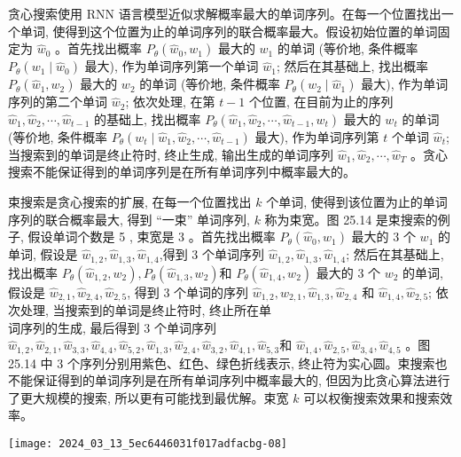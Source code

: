 \documentclass[10pt]{article}
\begin{document}
贪心搜索使用 RNN 语言模型近似求解概率最大的单词序列。在每一个位置找出一个单词, 使得到这个位置为止的单词序列的联合概率最大。假设初始位置的单词固定为 $\hat{w}_{0}$ 。首先找出概率 $P_{\theta}\left(\hat{w}_{0}, w_{1}\right)$ 最大的 $w_{1}$ 的单词 (等价地, 条件概率 $P_{\theta}\left(w_{1} \mid \hat{w}_{0}\right)$ 最大), 作为单词序列第一个单词 $\hat{w}_{1}$; 然后在其基础上, 找出概率 $P_{\theta}\left(\hat{w}_{1}, w_{2}\right)$ 最大的 $w_{2}$ 的单词 (等价地, 条件概率 $P_{\theta}\left(w_{2} \mid \hat{w}_{1}\right)$ 最大), 作为单词序列的第二个单词 $\hat{w}_{2}$; 依次处理, 在第 $t-1$ 个位置, 在目前为止的序列 $\hat{w}_{1}, \hat{w}_{2}, \cdots, \hat{w}_{t-1}$ 的基础上, 找出概率 $P_{\theta}\left(\hat{w}_{1}, \hat{w}_{2}, \cdots, \hat{w}_{t-1}, w_{t}\right)$ 最大的 $w_{t}$ 的单词 (等价地, 条件概率 $P_{\theta}\left(w_{t} \mid \hat{w}_{1}, \hat{w}_{2}, \cdots, \hat{w}_{t-1}\right)$ 最大), 作为单词序列第 $t$ 个单词 $\hat{w}_{t}$; 当搜索到的单词是终止符时, 终止生成, 输出生成的单词序列 $\hat{w}_{1}, \hat{w}_{2}, \cdots, \hat{w}_{T}$ 。贪心搜索不能保证得到的单词序列是在所有单词序列中概率最大的。

束搜索是贪心搜索的扩展, 在每一个位置找出 $k$ 个单词, 使得到该位置为止的单词序列的联合概率最大, 得到 “一束” 单词序列, $k$ 称为束宽。图 25.14 是束搜索的例子, 假设单词个数是 5 , 束宽是 3 。首先找出概率 $P_{\theta}\left(\hat{w}_{0}, w_{1}\right)$ 最大的 3 个 $w_{1}$ 的单词, 假设是 $\hat{w}_{1,2}, \hat{w}_{1,3}, \hat{w}_{1,4}$,得到 3 个单词序列 $\hat{w}_{1,2}, \hat{w}_{1,3}, \hat{w}_{1,4}$; 然后在其基础上, 找出概率 $P_{\theta}\left(\hat{w}_{1,2}, w_{2}\right), P_{\theta}\left(\hat{w}_{1,3}, w_{2}\right)$和 $P_{\theta}\left(\hat{w}_{1,4}, w_{2}\right)$ 最大的 3 个 $w_{2}$ 的单词, 假设是 $\hat{w}_{2,1}, \hat{w}_{2,4}, \hat{w}_{2,5}$, 得到 3 个单词的序列 $\hat{w}_{1,2}, \hat{w}_{2,1}, \hat{w}_{1,3}, \hat{w}_{2,4}$ 和 $\hat{w}_{1,4}, \hat{w}_{2,5}$; 依次处理, 当搜索到的单词是终止符时, 终止所在单\\
词序列的生成, 最后得到 3 个单词序列 $\hat{w}_{1,2}, \hat{w}_{2,1}, \hat{w}_{3,3}, \hat{w}_{4,4}, \hat{w}_{5,2}, \hat{w}_{1,3}, \hat{w}_{2,4}, \hat{w}_{3,2}, \hat{w}_{4,1}, \hat{w}_{5,3}$和 $\hat{w}_{1,4}, \hat{w}_{2,5}, \hat{w}_{3,4}, \hat{w}_{4,5}$ 。图 25.14 中 3 个序列分别用紫色、红色、绿色折线表示, 终止符为实心圆。束搜索也不能保证得到的单词序列是在所有单词序列中概率最大的, 但因为比贪心算法进行了更大规模的搜索, 所以更有可能找到最优解。束宽 $k$ 可以权衡搜索效果和搜索效率。

\begin{center}
\texttt{[image: 2024\_03\_13\_5ec6446031f017adfacbg-08]}
\end{center}
\end{document}
